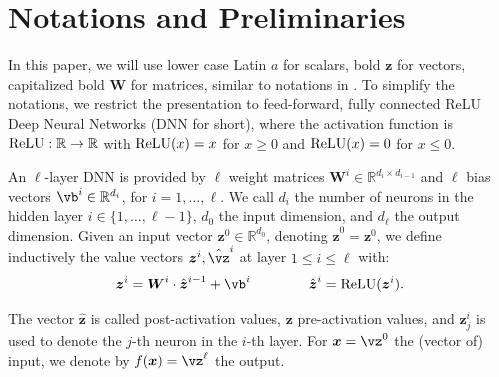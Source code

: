 \section{Notations and Preliminaries}
\label{s.notation}

	In this paper, we will use lower case Latin $a$ for scalars, bold $\boldsymbol{z}$ for vectors, 
	capitalized bold $\boldsymbol{W}$ for matrices, similar to notations in \cite{crown}.
	To simplify the notations, we restrict the presentation to feed-forward, 
	fully connected ReLU Deep Neural Networks (DNN for short), where the activation function is $\mathrm{ReLU}: \mathbb{R} \rightarrow \mathbb{R}$ with
	$\mathrm{ReLU}(x)=x$ for $x \geq 0$ and $\mathrm{ReLU}(x)=0$ for $x \leq 0$.
	
	
	
	
	An $\ell$-layer DNN is provided by $\ell$ weight matrices 
	$\boldsymbol{W}^i \in \mathbb{R}^{d_i\times d_{i-1}}$
	and $\ell$ bias vectors $\vb^i \in \mathbb{R}^{d_i}$, for $i=1, \ldots, \ell$.
	We call $d_i$ the number of neurons in the hidden layer 
	$i \in \{1, \ldots, \ell-1\}$,
	$d_0$ the input dimension, and $d_\ell$ the output dimension.
	Given an input vector $\boldsymbol{z}^0 \in \mathbb{R}^{d_0}$, 
	denoting $\hat{\boldsymbol{z}}^{0}={\boldsymbol{z}}^0$, we define inductively the value vectors $\boldsymbol{z}^i,\hat{\vz}^i$ at layer $1 \leq i \leq \ell$ with:
	\begin{align*}
		\boldsymbol{z}^{i} = \boldsymbol{W}^i\cdot \hat{\boldsymbol{z}}^{i-1}+ \vb^i \qquad \, \qquad
		\hat{\boldsymbol{z}}^{i} = \ReLU({\boldsymbol{z}}^i).
	\end{align*} 
	
\vspace{-0.4cm}

	The vector $\hat{\boldsymbol{z}}$ is called post-activation values, $\boldsymbol{z}$ pre-activation values, 
	and $\boldsymbol{z}^{i}_j$ is used to denote the $j$-th neuron in the $i$-th layer. 
	For $\boldsymbol{x}=\vz^0$ the (vector of) input, we denote by $f(\boldsymbol{x})=\vz^\ell$ the output. %
	
